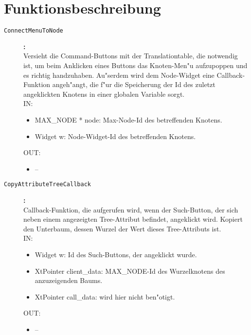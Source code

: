 


\section{Funktionsbeschreibung}

\begin{description}

\item[\tt ConnectMenuToNode]{\bf :\\}
Versieht die Command-Buttons mit der Translationtable, die notwendig ist, um beim Anklicken eines Buttons das Knoten-Men"u aufzupoppen und es richtig handzuhaben. Au"serdem wird dem Node-Widget eine Callback-Funktion angeh"angt, die f"ur die Speicherung der Id des zuletzt angeklickten Knotens in einer globalen Variable sorgt. \\
IN:
\begin{itemize}
   \item MAX\_NODE * node: Max-Node-Id des betreffenden Knotens.\item Widget w:        Node-Widget-Id des betreffenden Knotens.
\end{itemize}
OUT:
\begin{itemize}
   \item --
\end{itemize}

\item[\tt CopyAttributeTreeCallback]{\bf :\\}
Callback-Funktion, die aufgerufen wird, wenn der Such-Button, der sich neben einem angezeigten Tree-Attribut befindet, angeklickt wird. Kopiert den Unterbaum, dessen Wurzel der Wert dieses Tree-Attributs ist. \\
IN:
\begin{itemize}
   \item Widget w:              Id des Such-Buttons, der angeklickt wurde. \item XtPointer client\_data: MAX\_NODE-Id des Wurzelknotens des anzuzeigenden Baums. \item XtPointer call\_data:   wird hier nicht ben"otigt.
\end{itemize}
OUT:
\begin{itemize}
   \item --
\end{itemize}


\end{description}
